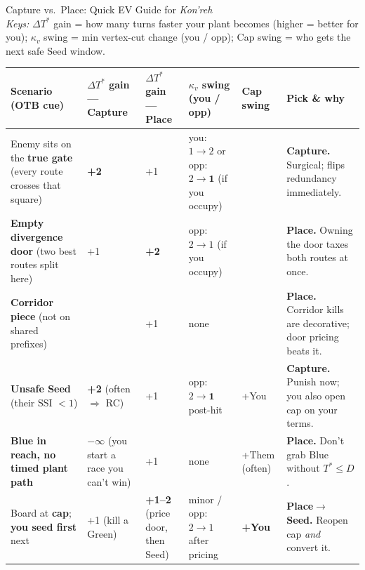 \documentclass[11pt]{article}
\newcommand{\Tstar}{T^\ast}
\newcommand{\D}{D}
\newcommand{\kappav}{\kappa_v}
\newcommand{\dT}{\Delta \Tstar}
\renewcommand{\arraystretch}{1.15}
\begin{document}
\bigskip
\begin{center}
  {\LARGE Capture vs.\ Place: Quick EV Guide for \textit{Kon'reh}}\\[4pt]
  \small\emph{Keys:}
  $\dT$ gain = how many turns faster your plant becomes (higher = better for you);\;
  $\kappav$ swing = min vertex-cut change (you / opp);\;
  Cap swing = who gets the next safe Seed window.
  \end{center}
  
  \renewcommand{\arraystretch}{1.25}
  \setlength{\tabcolsep}{6pt}
  \small
  \begin{tabularx}{\textwidth}{>{\raggedright\arraybackslash}X
  >{\raggedleft\arraybackslash}p{1.7cm}
  >{\raggedleft\arraybackslash}p{1.8cm}
  >{\raggedright\arraybackslash}p{3.0cm}
  >{\raggedright\arraybackslash}p{1.7cm}
  >{\raggedright\arraybackslash}X}
  \toprule
  \textbf{Scenario (OTB cue)} & \textbf{$\dT$ gain --- Capture} & \textbf{$\dT$ gain --- Place} & \textbf{$\kappav$ swing (you / opp)} & \textbf{Cap swing} & \textbf{Pick \& why}\\
  \midrule
  Enemy sits on the \textbf{true gate} (every route crosses that square) & \textbf{+2} & +1 & you: \textbf{$1 \!\to\! 2$} \; or \; opp: $2 \!\to\! \textbf{1}$ (if you occupy) & 0 & \textbf{Capture.} Surgical; flips redundancy immediately.\\
  \addlinespace
  \textbf{Empty divergence door} (two best routes split here) & +1 & \textbf{+2} & opp: \textbf{$2 \!\to\! 1$} (if you occupy) & 0 & \textbf{Place.} Owning the door taxes both routes at once.\\
  \addlinespace
  \textbf{Corridor piece} (not on shared prefixes) & 0 & +1 & none & 0 & \textbf{Place.} Corridor kills are decorative; door pricing beats it.\\
  \addlinespace
  \textbf{Unsafe Seed} (their SSI $< 1$) & \textbf{+2} (often $\Rightarrow$ RC) & +1 & opp: $2 \!\to\! \textbf{1}$ post-hit & +You & \textbf{Capture.} Punish now; you also open cap on your terms.\\
  \addlinespace
  \textbf{Blue in reach, no timed plant path} & $\boldsymbol{-\infty}$ (you start a race you can't win) & +1 & none & +Them (often) & \textbf{Place.} Don't grab Blue without $\Tstar \le \D$.\\
  \addlinespace
  Board at \textbf{cap}; \textbf{you seed first} next & +1 (kill a Green) & \textbf{+1--2} (price door, then Seed) & minor / opp: $2 \!\to\! 1$ after pricing & \textbf{+You} & \textbf{Place$\to$Seed.} Reopen cap \emph{and} convert it.\\

\end{tabularx}
\end{document}
